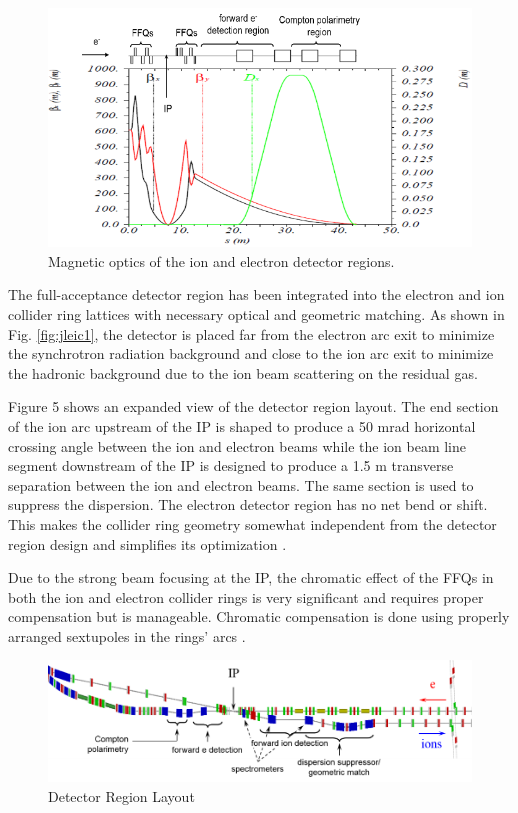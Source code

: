 \begin{figure}[!htb]
	\centering	
	\includegraphics[width=.75\textwidth]{../../img/electron_magnet_optics}	
	\caption{Magnetic optics of the ion and electron detector regions.}
	\label{fig:ele_magnet_optics}
	\end{figure}



The full-acceptance detector region has been integrated into the electron and ion collider ring lattices with necessary optical and geometric matching. As shown in Fig. \ref{fig:jleic1}, the detector is placed far from the electron arc exit to minimize the synchrotron radiation background and close to the ion arc exit to minimize the hadronic background due to the ion beam scattering on the residual gas.

Figure 5 shows an expanded view of the detector region layout. The end section of the ion arc upstream of the IP is shaped to produce a 50 mrad horizontal crossing angle between the ion and electron beams while the ion beam line segment downstream of the IP is designed to produce a 1.5 m transverse separation between the ion and electron beams. The same section is used to suppress the dispersion. The electron detector region has no net bend or shift. This makes the collider ring geometry somewhat independent from the detector region design and simplifies its optimization
 \cite{Lin}.

Due to the strong beam focusing at the IP, the chromatic effect of the FFQs in both the ion and electron collider rings is very significant and requires proper compensation but is manageable. Chromatic compensation is done using properly arranged sextupoles in the rings’ arcs \cite{Nosochkov:2015}.

\begin{figure}[!htb]
	\centering
	\includegraphics[width=.75\textwidth]{../../img/detector_region_layout}
	\caption{Detector Region Layout}
	\label{fig:detector_region_layout}
\end{figure}